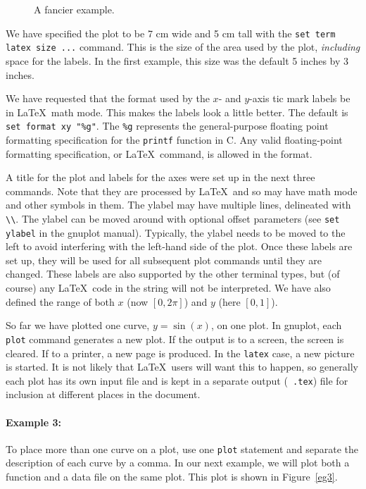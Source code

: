 \begin{figure}[htbp]
  \begin{center}
    
  \end{center}
  \caption{A fancier example.}
  \label{eg2}
\end{figure}

We have specified the plot to be 7 cm wide and 5 cm tall with
the {\tt set term latex size ...} command. This is the size of the 
area used by the plot, {\em including} space for the labels.
In the first example, this size was the default 5 inches by 3 inches.

We have requested that the format used by the $x$- and $y$-axis tic
mark labels be in \LaTeX\ math mode. This makes the labels look a
little better. The default is \verb+set format xy "%g"+. The \verb+%g+
represents the general-purpose floating point formatting specification
for the {\tt printf} function in C. Any valid floating-point
formatting specification, or \LaTeX\ command, is allowed in the
format.

A title for the plot and labels for the axes were set up in the next
three commands.  Note that they are processed by \LaTeX\ and so may
have math mode and other symbols in them. The ylabel may have multiple
lines, delineated with \verb+\\+.  The ylabel can be moved around with
optional offset parameters (see {\tt set ylabel} in the gnuplot
manual). Typically, the ylabel needs to be moved to the left to avoid
interfering with the left-hand side of the plot.  Once these labels
are set up, they will be used for all subsequent plot commands until
they are changed. These labels are also supported by the other
terminal types, but (of course) any \LaTeX\ code in the string will
not be interpreted. We have also defined the range of both $x$ (now
$[0,2\pi]$) and $y$ (here $[0,1]$).

So far we have plotted one curve, $y=\sin(x)$, on one plot. In
gnuplot, each {\tt plot} command generates a new plot. If the output
is to a screen, the screen is cleared. If to a printer, a new page is
produced. In the {\tt latex} case, a new picture is started. It is not
likely that \LaTeX\ users will want this to happen, so generally each
plot has its own input file and is kept in a separate output ({\tt
.tex}) file for inclusion at different places in the document.

\paragraph{Example 3:} To place more than one curve on a plot, use one
{\tt plot} statement and separate the description of each curve by a
comma. In our next example, we will plot both a function and a data
file on the same plot. This plot is shown in Figure~\ref{eg3}.

